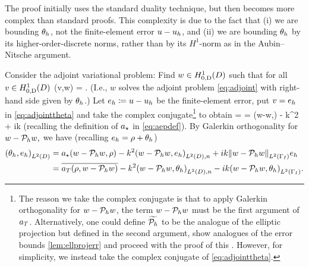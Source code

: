 The proof initially uses the standard duality technique, but then becomes more complex than standard proofs. This complexity is due to the fact that (i) we are bounding $\theta_{h}$, not the finite-element error $u-u_{h}$, and (ii) we are bounding $\theta_{h}$ by its higher-order-discrete norms, rather than by its $H^1$-norm as in the Aubin--Nitsche argument.

Consider the adjoint variational problem: Find $w \in \HozDD$ such that for all $v \in \HozDD$
\beq\label{eq:adjointtheta}
\aT(v,w) = .
\eeq
(I.e., $w$ solves the adjoint problem \cref{eq:adjoint} with right-hand side given by $\theta_{h}$.) Let $e_{h} \coloneqq u -u_{h}$ be the finite-element error, put $v = e_{h}$ in \cref{eq:adjointtheta} and take the complex conjugate\footnote{The reason we take the complex conjugate is that to apply Galerkin orthogonality for $w-\mathcal P_{h} w$, the term $w-\mathcal P_{h} w$ must be the first argument of $a_{T}$. Alternatively, one could define $\widetilde{\mathcal P_{h}}$ to be the analogue of the elliptic projection but defined in the second argument, show analogues of the error bounds \cref{lem:ellprojerr} and proceed with the proof of this . However, for simplicity, we instead take the complex conjugate of \cref{eq:adjointtheta}.} to obtain
\beqs
\IPLtD{\thetah}{\eh} =  = \aep(w-\Ph w,\eh) - k^2  + ik 
\eeqs
(recalling the definition of $a_{\star}$ in \cref{eq:aepdef}). By Galerkin orthogonality for $w-\mathcal P_{h} w,$ we have (recalling $e_{h} = \rho + \theta_{h}$)
\begin{align}
  \IPLtD{\thetah}{\eh} &= \aep(w-\Ph w,\rho) - k^2 \IPLtDn{w-\Ph w}{\eh} + ik \NLtGI{w - \Ph w}{\eh}\nonumber\\
&= \overline{\aT(\rho,w-\Ph w)}  -k^2 \IPLtDn{w-\Ph w}{\thetah} -ik \IPLtGI{w-\Ph w}{\thetah}.\label{eq:doublego}
\end{align}


